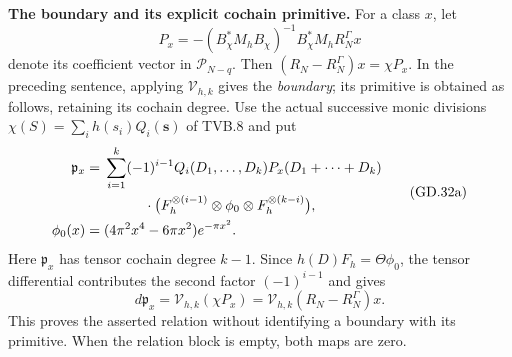 
\textbf{The boundary and its explicit cochain primitive.}
For a class \(x\), let
\[
P_x=-(B_\chi^*M_hB_\chi)^{-1}B_\chi^*M_hR_N^\Gamma x
\]
denote its coefficient vector in \(\mathcal P_{N-q}\).
Then \((R_N-R_N^\Gamma)x=\chi P_x\).
In the preceding sentence, applying \(\mathcal V_{h,k}\) gives the
\emph{boundary}; its primitive is obtained as follows, retaining its
cochain degree. Use the actual successive monic divisions
\(\chi(S)=\sum_i h(s_i)Q_i(\mathbf s)\) of TVB.8 and put
\[
\begin{split}
\mathfrak p_x={}&\sum_{i=1}^k(-1)^{i-1}
 Q_i(D_1,\ldots,D_k)P_x(D_1+\cdots+D_k)\\
&\hspace{0.4in}\cdot
 \bigl(F_h^{\otimes(i-1)}\otimes\phi_0
                  \otimes F_h^{\otimes(k-i)}\bigr),\\
\phi_0(x)={}&(4\pi^2x^4-6\pi x^2)e^{-\pi x^2}.
\end{split} \tag{GD.32a}
\]
Here \(\mathfrak p_x\) has tensor cochain degree \(k-1\).
Since \(h(D)F_h=\Theta\phi_0\), the tensor differential contributes
the second factor \((-1)^{i-1}\) and gives
\[
d\mathfrak p_x=\mathcal V_{h,k}(\chi P_x)
              =\mathcal V_{h,k}(R_N-R_N^\Gamma)x. \tag{GD.32b}
\]
This proves the asserted relation without identifying a boundary with its
primitive. When the relation block is empty, both maps are zero.

